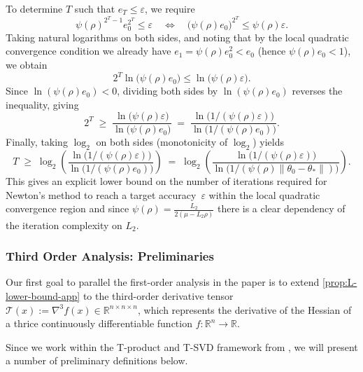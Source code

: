 \documentclass{article}
\theoremstyle{plain}
\theoremstyle{definition}
\theoremstyle{remark}
\begin{document}
To determine $T$ such that $e_T \le \varepsilon$, we require
\[
\psi(\rho)^{2^T - 1} e_0^{2^T} \le \varepsilon
\quad \Leftrightarrow \quad
\bigl(\psi(\rho)e_0\bigr)^{2^T} \le \psi(\rho)\varepsilon.
\]
Taking natural logarithms on both sides, and noting that by the local quadratic convergence condition we already have 
$e_1 = \psi(\rho)e_0^2 < e_0$ (hence $\psi(\rho)e_0<1$), we obtain 
\[
2^T \ln\!\bigl(\psi(\rho)e_0\bigr)\le \ln\!\bigl(\psi(\rho)\varepsilon\bigr).
\]
Since $\ln(\psi(\rho)e_0)<0$, dividing both sides by $\ln(\psi(\rho)e_0)$ reverses
the inequality, giving
\[
2^T \;\ge\; \frac{\ln\!\bigl(\psi(\rho)\varepsilon\bigr)}{\ln\!\bigl(\psi(\rho)e_0\bigr)}
\;=\; \frac{\ln\!\bigl(1/(\psi(\rho)\varepsilon)\bigr)}{\ln\!\bigl(1/(\psi(\rho)e_0)\bigr)}.
\]
Finally, taking $\log_2$ on both sides (monotonicity of $\log_2$) yields
\[
T \;\ge\;
\log_2\!\left(
\frac{
\ln\!\bigl(1 / (\psi(\rho)\varepsilon)\bigr)
}{
\ln\!\bigl(1 / (\psi(\rho)e_0)\bigr)
}
\right)
\;=\;
\log_2\!\left(
\frac{
\ln\!\bigl(1 / (\psi(\rho)\varepsilon)\bigr)
}{
\ln\!\bigl(1 / (\psi(\rho)\|\theta_0-\theta_*\|)\bigr)
}
\right).
\]
This gives an explicit lower bound on the number of iterations required for Newton’s method to reach a target accuracy~$\varepsilon$ within the local quadratic convergence region and since $\psi(\rho) = \frac{L_2}{2(\mu -L_2\rho)}$ there is a clear dependency of the iteration complexity on $L_2$.

\subsubsection{Third Order Analysis: Preliminaries}
\label{subsec:third-order-b3}

Our first goal to parallel the first-order analysis in the paper is to extend \cref{prop:L-lower-bound-app} to the third-order derivative tensor
$\mathcal{T}(x):=\nabla^3 f(x)\in\mathbb{R}^{n\times n\times n}$,
which represents the derivative of the Hessian of a thrice continuously differentiable function $f:\mathbb{R}^n\to\mathbb{R}$. 

Since we work within the T-product and T-SVD framework from \citet{zhang2021note}, we will present a number of preliminary definitions below.
\end{document}
